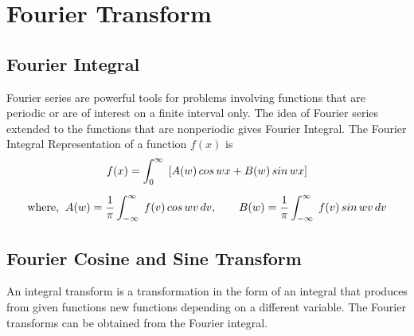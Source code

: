 \documentclass[aima331_lecturenotes_ku.tex]{subfiles}
\begin{document}
\chapter{Fourier Transform}
\section{Fourier Integral}
Fourier series are powerful tools for problems involving functions that are periodic or are of interest on a finite interval only. The idea of Fourier series extended to the functions that are nonperiodic gives Fourier Integral. The Fourier Integral Representation of a function $f(x)$ is
\begin{equation}
   \label{fourier_integral}
  \begin{gathered}[t]
    f(x) = \int_0^{\infty} \; \left [ A(w)\, cos\,wx + B(w)\, sin\,wx \right] \\[2mm]
     \text{where,} \hspace{2mm} A(w) =\frac{1}{\pi} \int_{-\infty}^{\infty} \; f(v)\,cos\,wv\,dv, \hspace{7mm} B(w) =\frac{1}{\pi} \int_{-\infty}^{\infty} \; f(v)\,sin\,wv\,dv
    \end{gathered}
  \end{equation}

\section{Fourier Cosine and Sine Transform}
An integral transform is a transformation in the form of an integral that produces from given functions new functions depending on a different variable. The Fourier transforms can be obtained from the Fourier integral.
\end{document}
